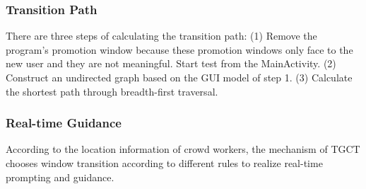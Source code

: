 \subsubsection{Transition Path}
There are three steps of calculating the transition path:
(1) Remove the program's promotion window because these promotion windows only face to the new user and they are not meaningful. Start test from the MainActivity.
(2) Construct an undirected graph based on the GUI model of step 1.
(3) Calculate the shortest path through breadth-first traversal.

\subsubsection{Real-time Guidance}
According to the location information of crowd workers, the mechanism of TGCT chooses window transition according to different rules to realize real-time prompting and guidance. 

